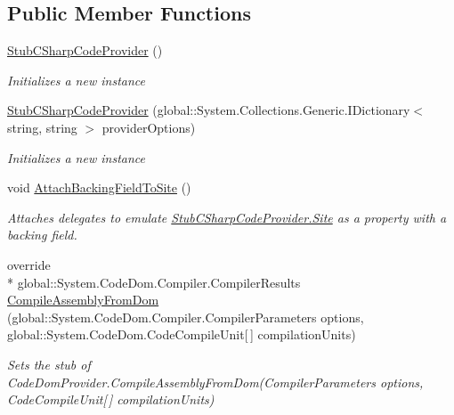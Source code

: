 \subsection*{Public Member Functions}
\begin{DoxyCompactItemize}
\item 
\hyperlink{class_microsoft_1_1_c_sharp_1_1_fakes_1_1_stub_c_sharp_code_provider_a93ed84a8f37721b1d1db80ca76b9b354}{Stub\-C\-Sharp\-Code\-Provider} ()
\begin{DoxyCompactList}\small\item\em Initializes a new instance\end{DoxyCompactList}\item 
\hyperlink{class_microsoft_1_1_c_sharp_1_1_fakes_1_1_stub_c_sharp_code_provider_ada879e3f34511415011ff48a2dff9617}{Stub\-C\-Sharp\-Code\-Provider} (global\-::\-System.\-Collections.\-Generic.\-I\-Dictionary$<$ string, string $>$ provider\-Options)
\begin{DoxyCompactList}\small\item\em Initializes a new instance\end{DoxyCompactList}\item 
void \hyperlink{class_microsoft_1_1_c_sharp_1_1_fakes_1_1_stub_c_sharp_code_provider_a15bc572d684d811847766e996043a44f}{Attach\-Backing\-Field\-To\-Site} ()
\begin{DoxyCompactList}\small\item\em Attaches delegates to emulate \hyperlink{class_microsoft_1_1_c_sharp_1_1_fakes_1_1_stub_c_sharp_code_provider_a2c94554f13cbb114ada22e33e8d1a098}{Stub\-C\-Sharp\-Code\-Provider.\-Site} as a property with a backing field.\end{DoxyCompactList}\item 
override \\*
global\-::\-System.\-Code\-Dom.\-Compiler.\-Compiler\-Results \hyperlink{class_microsoft_1_1_c_sharp_1_1_fakes_1_1_stub_c_sharp_code_provider_a3bbae8bab33b004ab0d4134832b717ad}{Compile\-Assembly\-From\-Dom} (global\-::\-System.\-Code\-Dom.\-Compiler.\-Compiler\-Parameters options, global\-::\-System.\-Code\-Dom.\-Code\-Compile\-Unit\mbox{[}$\,$\mbox{]} compilation\-Units)
\begin{DoxyCompactList}\small\item\em Sets the stub of Code\-Dom\-Provider.\-Compile\-Assembly\-From\-Dom(\-Compiler\-Parameters options, Code\-Compile\-Unit\mbox{[}$\,$\mbox{]} compilation\-Units)\end{DoxyCompactList}\item 

\end{DoxyCompactItemize}

